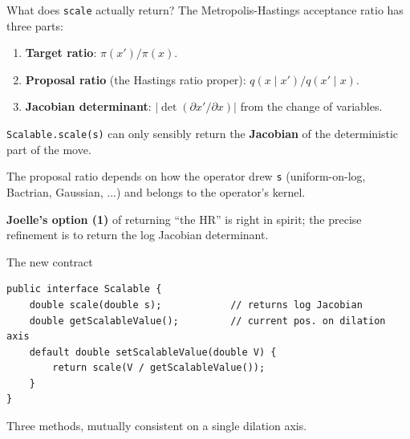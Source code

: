 \documentclass[aspectratio=169,11pt]{beamer}
\newcommand{\code}[1]{\texttt{#1}}
\begin{document}
\begin{frame}{What does \texttt{scale} actually return?}
The Metropolis-Hastings acceptance ratio has three parts:

\begin{enumerate}
\item \textbf{Target ratio}: $\pi(x') / \pi(x)$.
\item \textbf{Proposal ratio} (the Hastings ratio proper): $q(x \mid x') / q(x' \mid x)$.
\item \textbf{Jacobian determinant}: $|\det(\partial x' / \partial x)|$ from the change of variables.
\end{enumerate}

\vspace{1em}

\code{Scalable.scale(s)} can only sensibly return the \textbf{Jacobian} of the deterministic part of the move.

\vspace{0.5em}

The proposal ratio depends on how the operator drew \code{s} (uniform-on-log, Bactrian, Gaussian, ...) and belongs to the operator's kernel.

\vspace{0.5em}

\textbf{Joelle's option (1)} of returning ``the HR'' is right in spirit; the precise refinement is to return the log Jacobian determinant.
\end{frame}

\begin{frame}[fragile]{The new contract}
\begin{lstlisting}
public interface Scalable {
    double scale(double s);            // returns log Jacobian
    double getScalableValue();         // current pos. on dilation axis
    default double setScalableValue(double V) {
        return scale(V / getScalableValue());
    }
}
\end{lstlisting}

\vspace{0.5em}

Three methods, mutually consistent on a single dilation axis.
\end{frame}
\end{document}
